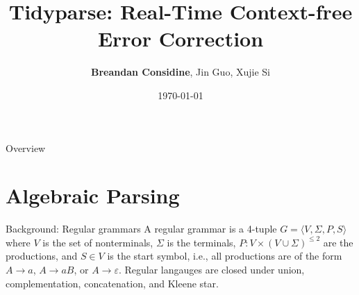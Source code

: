 \documentclass{beamer}
\title[Tidyparse: Real-Time Context-free Error Correction]{Tidyparse: Real-Time Context-free Error Correction}
\author[Considine, Guo, Si]{\textbf{Breandan Considine}, Jin Guo, Xujie Si}
\institute[McGill]{
    McGill University, Mila IQIA\\
    \medskip
    \textit{bre@ndan.co}
}
\date{\today}
\begin{document}
    \begin{frame}
        \titlepage
    \end{frame}

    \begin{frame}{Overview}
        \tableofcontents
    \end{frame}

    
    \section{Algebraic Parsing}\label{sec:algebraic-parsing}


    \begin{frame}{Background: Regular grammars}
        A regular grammar is a 4-tuple $G = \langle V, \Sigma, P, S\rangle$ where $V$ is the set of nonterminals, $\Sigma$ is the terminals, $P: V\times (V \cup \Sigma)^{\leq 2}$ are the productions, and $S\in V$ is the start symbol, i.e., all productions are of the form $A \rightarrow a$, $A \rightarrow a B$, or $A \rightarrow \varepsilon$. Regular langauges are closed under union, complementation, concatenation, and Kleene star.


\end{frame}
\end{document}
